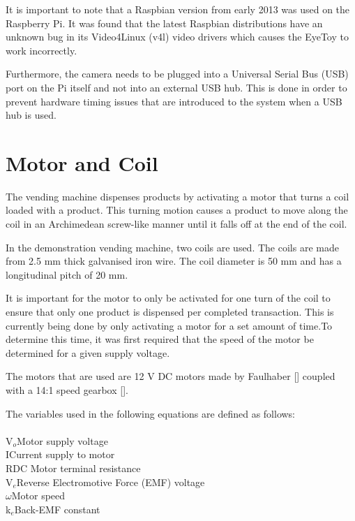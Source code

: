 It is important to note that a Raspbian version from early 2013 was used on the
Raspberry Pi. It was found that the latest Raspbian distributions have an
unknown bug in its Video4Linux (v4l) video drivers which causes the EyeToy to
work incorrectly. 

Furthermore, the camera needs to be plugged into a Universal Serial Bus (USB)
port on the Pi itself and not into an external USB hub. This is done in order to
prevent hardware timing issues that are introduced to the system when a USB hub is used.

\section{Motor and Coil}

The vending machine dispenses products by activating a motor that turns a coil
loaded with a product. This turning motion causes a product to move along the
coil in an Archimedean screw-like manner until it falls off at the end of the
coil. 

In the demonstration vending machine, two coils are used. The coils are made
from 2.5 mm thick galvanised iron wire. The coil diameter is 50 mm and has a
longitudinal pitch of 20 mm. 

It is important for the motor to only be activated for one turn of the coil to
ensure that only one product is dispensed per completed transaction. This is
currently being done by only activating a motor for a set amount of time.To
determine this time, it was first required that the speed of the motor be
determined for a given supply voltage.

The motors that are used are 12 V DC motors made by Faulhaber
[\cite{manual:dc-motors}] coupled with a 14:1 speed gearbox
[\cite{manual:gearbox}].

The variables used in the following equations are defined as follows:\\\\
V$_o$\dotfill Motor supply voltage\\
I\dotfill Current supply to motor\\
R\dotfill DC Motor terminal resistance\\
V$_e$\dotfill Reverse Electromotive Force (EMF) voltage\\
$\omega$\dotfill Motor speed\\
k$_e$\dotfill Back-EMF constant\\

